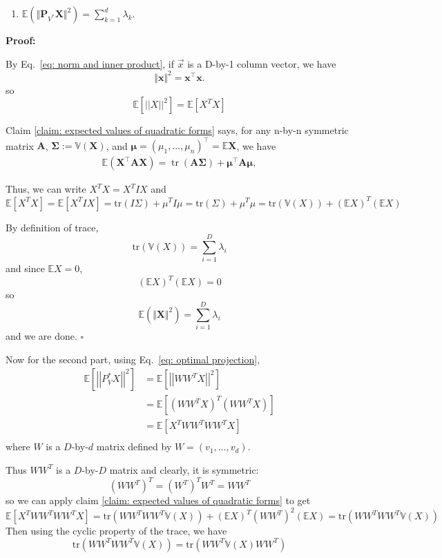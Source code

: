 \documentclass[11pt,letterpaper, leqno]{article}
\numberwithin{equation}{section}
\numberwithin{theorem}{section}
\numberwithin{lemma}{section}
\numberwithin{corollary}{section}
\numberwithin{definition}{section}
\numberwithin{proposition}{section}
\numberwithin{remark}{section}
\numberwithin{example}{section}
\newcommand{\T}{\intercal}
\newcommand{\E}{\mathbb{E}}
\newcommand{\abs}[1]{\left\vert #1 \right\vert}
\newcommand{\V}{\mathbb{V}}
\begin{document}
\begin{enumerate}
\begin{enumerate}
                \item $ \mathbb{E}\left( \Vert \boldsymbol{P}_{V^*} \boldsymbol{X} \Vert^2 \right) =\sum_{k=1}^d \lambda_k$.
            \end{enumerate}

            \textbf{Proof:} 

            By Eq.~\eqref{eq: norm and inner product}, if $\vec{x}$ is a D-by-1 column vector, we have 
            \[\Vert \boldsymbol{x}\Vert^2= \boldsymbol{x}^\T \boldsymbol{x}.\]
            so 
            \[\E[\abs{\abs{X}}^2] = \E[X^TX]\]
            
            Claim \ref{claim: expected values of quadratic forms} says, for any n-by-n symmetric matrix  $\boldsymbol{A}$, $\boldsymbol{\Sigma}:=\mathbb{V}(\boldsymbol{X})$, and $\boldsymbol{\mu}=(\mu_1,\ldots,\mu_n)^\T=\mathbb{E}\boldsymbol{X}$, we have
            \begin{align}
                \mathbb{E}(\boldsymbol{X}^\T\boldsymbol{A}\boldsymbol{X}) = \operatorname{tr}(\boldsymbol{A \Sigma})+\boldsymbol{\mu}^\T \boldsymbol{A} \boldsymbol{\mu},
            \end{align}

            Thus, we can write $X^TX = X^T I X$ and 
            \[\E[X^TX] = \E[X^TIX] = \text{tr}(I\Sigma) + \mu^T I \mu = \text{tr}(\Sigma) + \mu^T\mu = \text{tr}(\V(X)) + (\E X)^T(\E X)\]

            By definition of trace, 
            \[\text{tr}(\V(X)) = \sum_{i=1}^D \lambda_i\]
            and since $\E X = 0$,
            \[(\E X)^T (\E X) = 0\]
            so 
            \[\mathbb{E}\left(\Vert \boldsymbol{X}\Vert^2\right) = \sum_{i=1}^D \lambda_i\] 
            and we are done. $\square$ 

        \color{blue}
            Now for the second part, using Eq.~\eqref{eq: optimal projection},
            \begin{align*}
                \E[\abs{\abs{P_V^* X}}^2] &= \E[\abs{\abs{W W^T X}}^2] \\
                    &= \E[(WW^TX)^T(WW^TX)]\\ 
                    &= \E[X^TWW^TWW^TX]\\
            \end{align*}
            where $W$ is a $D$-by-$d$ matrix defined by $W = (v_1, \dots, v_d)$. 

            Thus $WW^T$ is a $D$-by-$D$ matrix and clearly, it is symmetric: 
            \[(WW^T)^T = (W^T)^TW^T = WW^T\]
            so we can apply claim \ref{claim: expected values of quadratic forms} to get
            \[\E[X^T WW^T WW^T X] = \text{tr}(WW^T WW^T \V(X)) + (\E X)^T (WW^T)^2 (\E X) = \text{tr}(WW^T WW^T \V(X))\]
            Then using the cyclic property of the trace, we have 
            \[\text{tr}(WW^T WW^T \V(X)) = \text{tr}(WW^T \V(X) WW^T)\] 
            

\end{enumerate}
\end{document}
